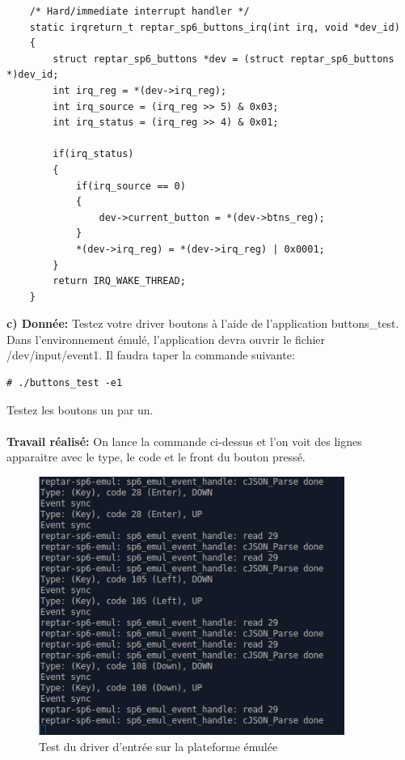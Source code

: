 \begin{lstlisting}
	/* Hard/immediate interrupt handler */
	static irqreturn_t reptar_sp6_buttons_irq(int irq, void *dev_id)
	{
		struct reptar_sp6_buttons *dev = (struct reptar_sp6_buttons *)dev_id;
		int irq_reg = *(dev->irq_reg);
		int irq_source = (irq_reg >> 5) & 0x03;
		int irq_status = (irq_reg >> 4) & 0x01;	
		
		if(irq_status) 
		{
			if(irq_source == 0) 
			{
				dev->current_button = *(dev->btns_reg);
			}
			*(dev->irq_reg) = *(dev->irq_reg) | 0x0001;
		}
		return IRQ_WAKE_THREAD;
	}
\end{lstlisting}

\textbf{c) Donnée: }Testez votre driver boutons à l'aide de l'application buttons\_test. Dans l'environnement émulé,
l'application devra ouvrir le fichier /dev/input/event1. Il faudra taper la commande suivante:
\begin{lstlisting}
# ./buttons_test -e1
\end{lstlisting}
Testez les boutons un par un.\\\\
\textbf{Travail réalisé: }
On lance la commande ci-dessus et l'on voit des lignes apparaitre avec le type, le code et le front du bouton pressé. 
\begin{figure}[H]
	\begin{center}
		\includegraphics[width=10cm]{img/app_event_input_emul.png}
		\caption{Test du driver d'entrée sur la plateforme émulée}
		\label{emul_device_input}
	\end{center}
\end{figure}


